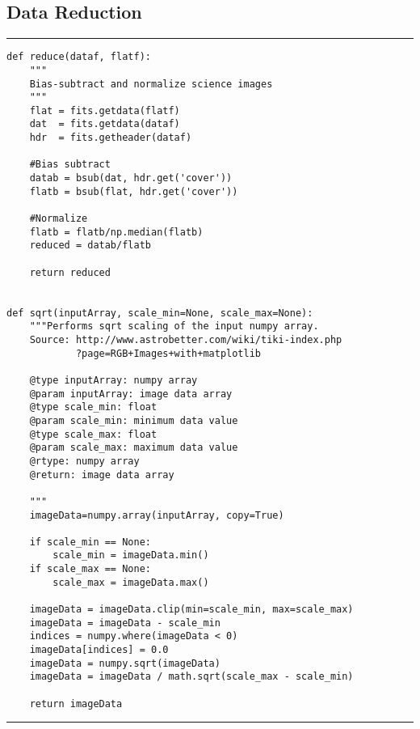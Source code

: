 \documentclass[preprint]{aastex62}
\begin{document}
\subsection{Data Reduction} \label{code:reduction}
\hrule
\begin{lstlisting}
def reduce(dataf, flatf):
    """
    Bias-subtract and normalize science images
    """  
    flat = fits.getdata(flatf)
    dat  = fits.getdata(dataf)
    hdr  = fits.getheader(dataf)

    #Bias subtract
    datab = bsub(dat, hdr.get('cover')) 
    flatb = bsub(flat, hdr.get('cover')) 
    
    #Normalize
    flatb = flatb/np.median(flatb)
    reduced = datab/flatb
    
    return reduced


def sqrt(inputArray, scale_min=None, scale_max=None):
    """Performs sqrt scaling of the input numpy array.
    Source: http://www.astrobetter.com/wiki/tiki-index.php
            ?page=RGB+Images+with+matplotlib

    @type inputArray: numpy array
    @param inputArray: image data array
    @type scale_min: float
    @param scale_min: minimum data value
    @type scale_max: float
    @param scale_max: maximum data value
    @rtype: numpy array
    @return: image data array
    
    """     
    imageData=numpy.array(inputArray, copy=True)
    
    if scale_min == None:
        scale_min = imageData.min()
    if scale_max == None:
        scale_max = imageData.max()

    imageData = imageData.clip(min=scale_min, max=scale_max)
    imageData = imageData - scale_min
    indices = numpy.where(imageData < 0)
    imageData[indices] = 0.0
    imageData = numpy.sqrt(imageData)
    imageData = imageData / math.sqrt(scale_max - scale_min)
    
    return imageData
\end{lstlisting}
\hrule \vspace{7pt}
\end{document}
